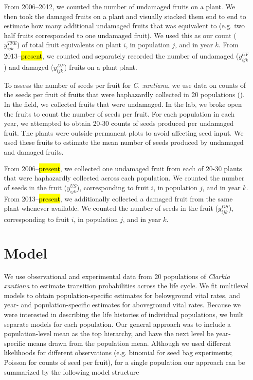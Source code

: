 \documentclass[12pt, oneside, titlepage]{article}   	%
\begin{document}
From 2006--2012, we counted the number of undamaged fruits on a plant. We then took the damaged fruits on a plant and visually stacked them end to end to estimate how many additional undamaged fruits that was equivalent to (e.g. two half fruits corresponded to one undamaged fruit). We used this as our count ($y^{TFE}_{ijk}$) of total fruit equivalents on plant $i$, in population $j$, and in year $k$. From 2013--\hl{present}, we counted and separately recorded the number of undamaged ($y^{UF}_{ijk}$) and damaged ($y^{DF}_{ijk}$) fruits on a plant plant. 

To assess the number of seeds per fruit for \textit{C. xantiana}, we use data on counts of the seeds per fruit of fruits that were haphazardly collected in 20 populations (\cite{eckhart2011}). In the field, we collected fruits that were undamaged. In the lab, we broke open the fruits to count the number of seeds per fruit. For each population in each year, we attempted to obtain 20-30 counts of seeds produced per undamaged fruit. The plants were outside permanent plots to avoid affecting seed input. We used these fruits to estimate the mean number of seeds produced by undamaged and damaged fruits.

From 2006--\hl{present}, we collected one undamaged fruit from each of 20-30 plants that were haphazardly collected across each population. We counted the number of seeds in the fruit ($y^{US}_{ijk}$), corresponding to fruit $i$, in population $j$, and in year $k$. From 2013--\hl{present}, we additionally collected a damaged fruit from the same plant whenever available. We counted the number of seeds in the fruit ($y^{DS}_{ijk}$), corresponding to fruit $i$, in population $j$, and in year $k$. 

\section{Model}

We use observational and experimental data from 20 populations of \textit{Clarkia xantiana} to estimate transition probabilities across the life cycle. We fit multilevel models to obtain population-specific estimates for belowground vital rates, and year- and population-specific estimates for aboveground vital rates. Because we were interested in describing the life histories of individual populations, we built separate models for each population. Our general approach was to include a population-level mean as the top hierarchy, and have the next level be year-specific means drawn from the population mean. Although we used different likelihoods for different observations (e.g. binomial for seed bag experiments; Poisson for counts of seed per fruit), for a single population our approach can be summarized by the following model structure
\end{document}
